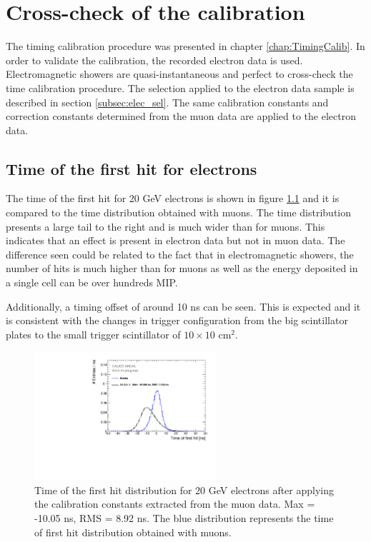 \chapter{Cross-check of the calibration}
\label{chap:TimingValidation}

The timing calibration procedure was presented in chapter \ref{chap:TimingCalib}. In order to validate the calibration, the recorded electron data is used. Electromagnetic showers are quasi-instantaneous and perfect to cross-check the time calibration procedure. The selection applied to the electron data sample is described in section \ref{subsec:elec_sel}. The same calibration constants and correction constants determined from the muon data are applied to the electron data.

\section{Time of the first hit for electrons}

The time of the first hit for 20 GeV electrons is shown in figure \ref{fig:Timing_electrons} and it is compared to the time distribution obtained with muons. The time distribution presents a large tail to the right and is much wider than for muons. This indicates that an effect is present in electron data but not in muon data. The difference seen could be related to the fact that in electromagnetic showers, the number of hits is much higher than for muons as well as the energy deposited in a single cell can be over hundreds MIP.

Additionally, a timing offset of around 10 ns can be seen. This is expected and it is consistent with the changes in trigger configuration from the big scintillator plates to the small trigger scintillator of $10\times10$ cm$^2$.

\begin{figure}[htbp!]
	\centering
	\includegraphics[width=0.6\textwidth]{../Thesis_Plots/Timing/Electrons/Plots/Timing_AllLayers_AfterMuons.pdf}
	\caption{Time of the first hit distribution for 20 GeV electrons after applying the calibration constants extracted from the muon data. Max = -10.05 ns, RMS = 8.92 ns. The blue distribution represents the time of first hit distribution obtained with muons.}
	\label{fig:Timing_electrons}
\end{figure}

